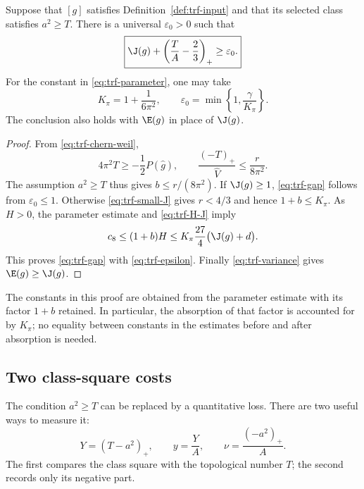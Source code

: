 \begin{theorem}
\label{thm:trf-gap}
Suppose that $[g]$ satisfies Definition~\ref{def:trf-input} and that its
selected class satisfies $a^2\ge T$.  There is a universal
$\varepsilon_0>0$ such that
\begin{equation}
 \boxed{\J(g)+\left(\frac{T}{A}-\frac23\right)_+
             \ge\varepsilon_0.}
 \label{eq:trf-gap}
\end{equation}
For the constant in \eqref{eq:trf-parameter}, one may take
\begin{equation}
 K_\pi=1+\frac1{6\pi^2},\qquad
 \varepsilon_0=\min\left\{1,\frac{\gamma}{K_\pi}\right\}.
 \label{eq:trf-epsilon}
\end{equation}
The conclusion also holds with $\E(g)$ in place of $\J(g)$.
\end{theorem}

\begin{proof}
From \eqref{eq:trf-chern-weil},
\begin{equation}
 4\pi^2T\ge-\frac12P(\widehat g),\qquad
 \frac{(-T)_+}{\widehat V}\le\frac{r}{8\pi^2}.
 \label{eq:trf-negative-T}
\end{equation}
The assumption $a^2\ge T$ thus gives $b\le r/(8\pi^2)$.
If $\J(g)\ge1$, \eqref{eq:trf-gap} follows from
$\varepsilon_0\le1$.  Otherwise \eqref{eq:trf-small-J} gives
$r<4/3$ and hence $1+b\le K_\pi$.  As $H>0$, the parameter estimate
and \eqref{eq:trf-H-J} imply
\[
 c_8\le(1+b)H
 \le K_\pi\frac{27}{4}\bigl(\J(g)+d\bigr).
\]
This proves \eqref{eq:trf-gap} with \eqref{eq:trf-epsilon}.
Finally \eqref{eq:trf-variance} gives $\E(g)\ge\J(g)$.
\end{proof}

The constants in this proof are obtained from the parameter estimate
with its factor $1+b$ retained.  In particular, the absorption of that
factor is accounted for by $K_\pi$; no equality between constants in
the estimates before and after absorption is needed.

\subsection{Two class-square costs}

The condition $a^2\ge T$ can be replaced by a quantitative loss.  There
are two useful ways to measure it:
\begin{equation}
 Y=(T-a^2)_+,\qquad y=\frac{Y}{A},\qquad
 \nu=\frac{(-a^2)_+}{A}.
 \label{eq:trf-cost-definitions}
\end{equation}
The first compares the class square with the topological number $T$;
the second records only its negative part.

